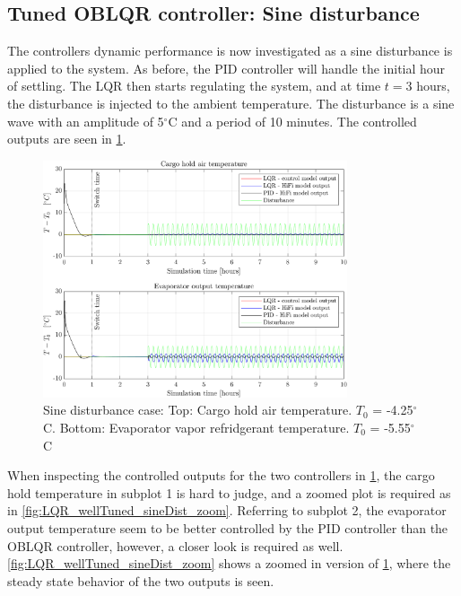 \newpage
\subsection{Tuned OBLQR controller: Sine disturbance}
The controllers dynamic performance is now investigated as a sine disturbance is applied to the system. As before, the PID controller will handle the initial hour of settling. The LQR then starts regulating the system, and at time $t=3$ hours, the disturbance is injected to the ambient temperature. The disturbance is a sine wave with an amplitude of 5$^{\circ}$C and a period of 10 minutes. The controlled outputs are seen in \cref{fig:LQR_wellTuned_sineDist}.

\begin{figure}[H]
	\centering
	\includegraphics[width=0.8\textwidth]{Graphics/fig_LQRvsKresten_sineDist.png}
	\caption{Sine disturbance case: Top: Cargo hold air temperature. $T_0$ = -4.25$^{\circ}$C. Bottom: Evaporator vapor refridgerant temperature. $T_0$ = -5.55$^{\circ}$C}
	\label{fig:LQR_wellTuned_sineDist}
\end{figure}

\noindent When inspecting the controlled outputs for the two controllers in \cref{fig:LQR_wellTuned_sineDist}, the cargo hold temperature in subplot 1 is hard to judge, and a zoomed plot is required as in \cref{fig:LQR_wellTuned_sineDist_zoom}. Referring to subplot 2, the evaporator output temperature seem to be better controlled by the PID controller than the OBLQR controller, however, a closer look is required as well. \cref{fig:LQR_wellTuned_sineDist_zoom} shows a zoomed in version of \cref{fig:LQR_wellTuned_sineDist}, where the steady state behavior of the two outputs is seen.

